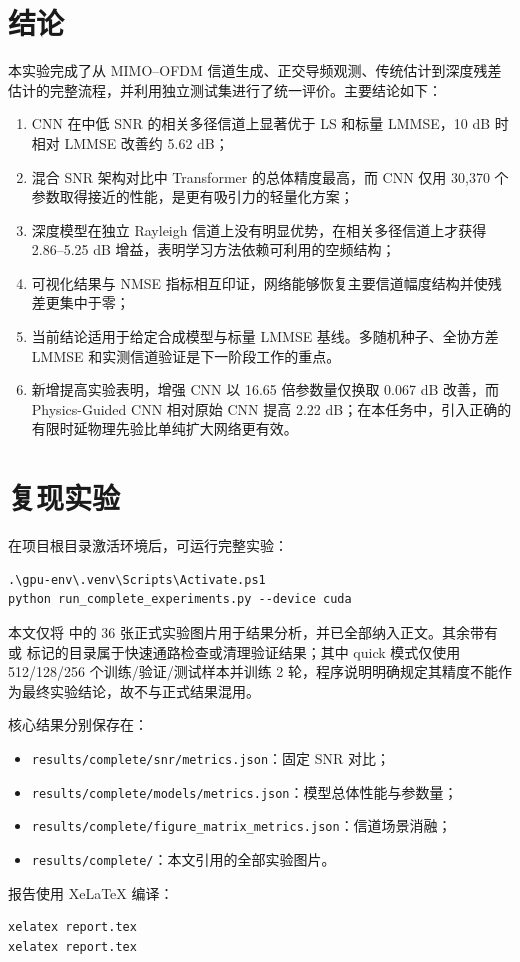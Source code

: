 \documentclass[UTF8,a4paper,12pt]{ctexart}
\begin{document}
\section{结论}

本实验完成了从 MIMO--OFDM 信道生成、正交导频观测、传统估计到深度残差估计的完整流程，并利用独立测试集进行了统一评价。主要结论如下：

\begin{enumerate}[label=(\arabic*)]
  \item CNN 在中低 SNR 的相关多径信道上显著优于 LS 和标量 LMMSE，10 dB 时相对 LMMSE 改善约 5.62 dB；
  \item 混合 SNR 架构对比中 Transformer 的总体精度最高，而 CNN 仅用 30,370 个参数取得接近的性能，是更有吸引力的轻量化方案；
  \item 深度模型在独立 Rayleigh 信道上没有明显优势，在相关多径信道上才获得 2.86--5.25 dB 增益，表明学习方法依赖可利用的空频结构；
  \item 可视化结果与 NMSE 指标相互印证，网络能够恢复主要信道幅度结构并使残差更集中于零；
  \item 当前结论适用于给定合成模型与标量 LMMSE 基线。多随机种子、全协方差 LMMSE 和实测信道验证是下一阶段工作的重点。
  \item 新增提高实验表明，增强 CNN 以 16.65 倍参数量仅换取 0.067 dB 改善，而 Physics-Guided CNN 相对原始 CNN 提高 2.22 dB；在本任务中，引入正确的有限时延物理先验比单纯扩大网络更有效。
\end{enumerate}

\appendix
\section{复现实验}

在项目根目录激活环境后，可运行完整实验：
\begin{lstlisting}[language={}]
.\gpu-env\.venv\Scripts\Activate.ps1
python run_complete_experiments.py --device cuda
\end{lstlisting}

本文仅将  中的 36 张正式实验图片用于结果分析，并已全部纳入正文。其余带有  或  标记的目录属于快速通路检查或清理验证结果；其中 quick 模式仅使用 512/128/256 个训练/验证/测试样本并训练 2 轮，程序说明明确规定其精度不能作为最终实验结论，故不与正式结果混用。

核心结果分别保存在：
\begin{itemize}
  \item \texttt{results/complete/snr/metrics.json}：固定 SNR 对比；
  \item \texttt{results/complete/models/metrics.json}：模型总体性能与参数量；
  \item \texttt{results/complete/figure\_matrix\_metrics.json}：信道场景消融；
  \item \texttt{results/complete/}：本文引用的全部实验图片。
\end{itemize}

报告使用 XeLaTeX 编译：
\begin{lstlisting}[language={}]
xelatex report.tex
xelatex report.tex
\end{lstlisting}
\end{document}

